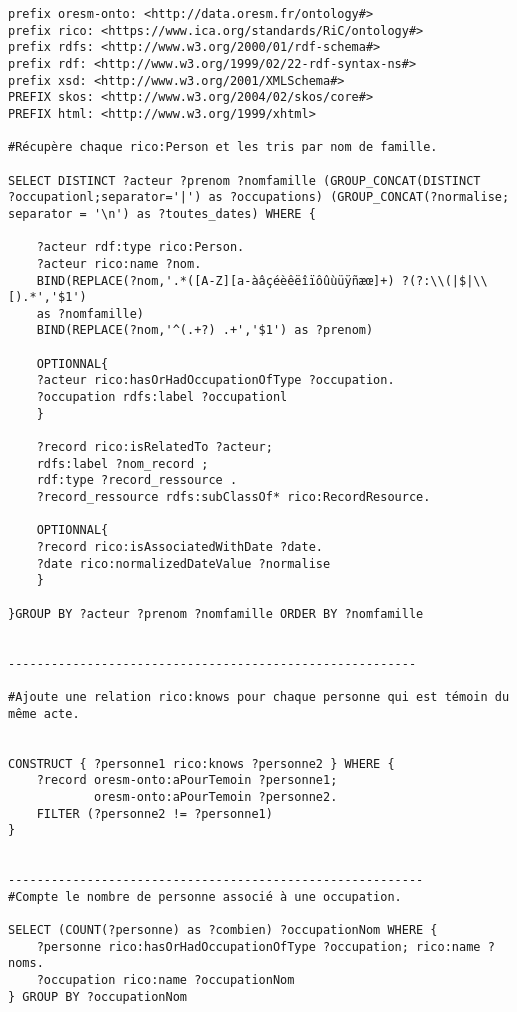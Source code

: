 \label{sparql}
\begin{verbatim}
prefix oresm-onto: <http://data.oresm.fr/ontology#>
prefix rico: <https://www.ica.org/standards/RiC/ontology#>
prefix rdfs: <http://www.w3.org/2000/01/rdf-schema#>
prefix rdf: <http://www.w3.org/1999/02/22-rdf-syntax-ns#>
prefix xsd: <http://www.w3.org/2001/XMLSchema#>
PREFIX skos: <http://www.w3.org/2004/02/skos/core#>
PREFIX html: <http://www.w3.org/1999/xhtml>

#Récupère chaque rico:Person et les tris par nom de famille.

SELECT DISTINCT ?acteur ?prenom ?nomfamille (GROUP_CONCAT(DISTINCT 
?occupationl;separator='|') as ?occupations) (GROUP_CONCAT(?normalise;
separator = '\n') as ?toutes_dates) WHERE { 

    ?acteur rdf:type rico:Person.
    ?acteur rico:name ?nom.
    BIND(REPLACE(?nom,'.*([A-Z][a-àâçéèêëîïôûùüÿñæœ]+) ?(?:\\(|$|\\[).*','$1') 
    as ?nomfamille)
    BIND(REPLACE(?nom,'^(.+?) .+','$1') as ?prenom)
    
    OPTIONNAL{
    ?acteur rico:hasOrHadOccupationOfType ?occupation.
    ?occupation rdfs:label ?occupationl
    }
    
    ?record rico:isRelatedTo ?acteur; 
    rdfs:label ?nom_record ; 
    rdf:type ?record_ressource .
    ?record_ressource rdfs:subClassOf* rico:RecordResource.
   
    OPTIONNAL{
    ?record rico:isAssociatedWithDate ?date. 
    ?date rico:normalizedDateValue ?normalise
    }

}GROUP BY ?acteur ?prenom ?nomfamille ORDER BY ?nomfamille


---------------------------------------------------------

#Ajoute une relation rico:knows pour chaque personne qui est témoin du même acte. 


CONSTRUCT { ?personne1 rico:knows ?personne2 } WHERE { 
	?record oresm-onto:aPourTemoin ?personne1; 
            oresm-onto:aPourTemoin ?personne2.
    FILTER (?personne2 != ?personne1)
}


----------------------------------------------------------
#Compte le nombre de personne associé à une occupation.

SELECT (COUNT(?personne) as ?combien) ?occupationNom WHERE {
    ?personne rico:hasOrHadOccupationOfType ?occupation; rico:name ?noms.
    ?occupation rico:name ?occupationNom
} GROUP BY ?occupationNom


\end{verbatim}

